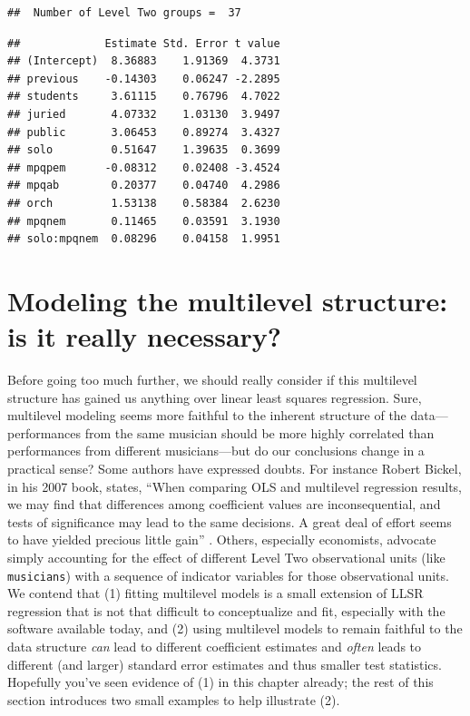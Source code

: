 \documentclass[
]{krantz}
\begin{document}
\begin{verbatim}
##  Number of Level Two groups =  37
\end{verbatim}

\begin{verbatim}
##             Estimate Std. Error t value
## (Intercept)  8.36883    1.91369  4.3731
## previous    -0.14303    0.06247 -2.2895
## students     3.61115    0.76796  4.7022
## juried       4.07332    1.03130  3.9497
## public       3.06453    0.89274  3.4327
## solo         0.51647    1.39635  0.3699
## mpqpem      -0.08312    0.02408 -3.4524
## mpqab        0.20377    0.04740  4.2986
## orch         1.53138    0.58384  2.6230
## mpqnem       0.11465    0.03591  3.1930
## solo:mpqnem  0.08296    0.04158  1.9951
\end{verbatim}

\hypertarget{multinecessary}{%
\section{Modeling the multilevel structure: is it really necessary?}\label{multinecessary}}

Before going too much further, we should really consider if this multilevel structure has gained us anything over linear least squares regression.  Sure, multilevel modeling  seems more faithful to the inherent structure of the data---performances from the same musician should be more highly correlated than performances from different musicians---but do our conclusions change in a practical sense? Some authors have expressed doubts. For instance Robert Bickel, in his 2007 book, states, ``When comparing OLS and multilevel regression results, we may find that differences among coefficient values are inconsequential, and tests of significance may lead to the same decisions. A great deal of effort seems to have yielded precious little gain'' \citep{Bickel2007}. Others, especially economists, advocate simply accounting for the effect of different Level Two observational units (like \texttt{musicians}) with a sequence of indicator variables for those observational units. We contend that (1) fitting multilevel models is a small extension of LLSR regression that is not that difficult to conceptualize and fit, especially with the software available today, and (2) using multilevel models to remain faithful to the data structure \emph{can} lead to different coefficient estimates and \emph{often} leads to different (and larger) standard error estimates and thus smaller test statistics. Hopefully you've seen evidence of (1) in this chapter already; the rest of this section introduces two small examples to help illustrate (2).
\end{document}
